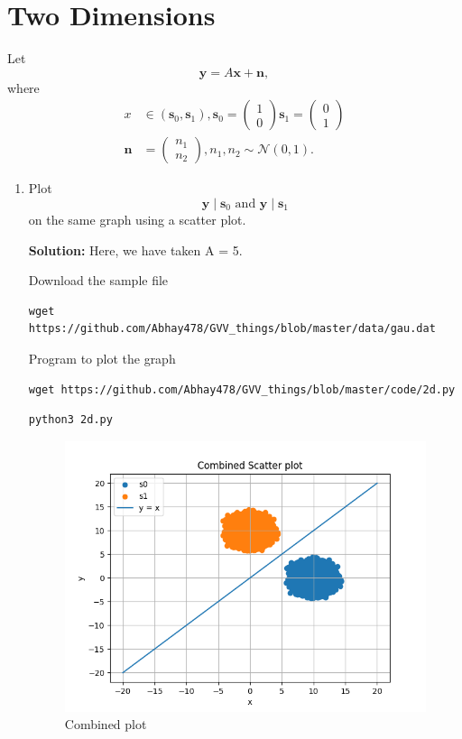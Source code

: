 \documentclass[journal,12pt,twocolumn]{IEEEtran}
\DeclareMathOperator*{\pipe}{|}
\renewcommand\thesection{\arabic{section}}
\providecommand{\mbf}{\mathbf}
\providecommand{\brak}[1]{\ensuremath{\left(#1\right)}}
\theoremstyle{remark}
\providecommand{\gauss}[2]{\mathcal{N}\ensuremath{\left(#1,#2\right)}}
\newcommand{\solution}{\noindent \textbf{Solution: }}
\newcommand{\myvec}[1]{\begin{pmatrix}#1\end{pmatrix}}
\numberwithin{equation}{section}
\numberwithin{equation}{section}
\begin{document}
        \newpage

\section{Two Dimensions}
Let 
\begin{equation}
\mbf{y} = A\mbf{x} + \mbf{n},
\end{equation}
where 
\begin{align}
x &\in \brak{\mbf{s}_0,\mbf{s}_1}, 
\mbf{s}_0 = \myvec{1 \\ 0} 
\mbf{s}_1 = \myvec{0 \\ 1}
\\
\mbf{n} &= \myvec{n_1 \\ n_2},
n_1,n_2 \sim \gauss{0}{1}.
\end{align}
%
\begin{enumerate}[label=\thesection.\arabic*,ref=\thesection.\theenumi]

\item
\label{ch5_fsk}
Plot 
%
\begin{equation}
\mbf{y}\pipe\mbf{s}_0 \text{ and } \mbf{y}\pipe\mbf{s}_1
\end{equation}
%
on the same graph using a scatter plot.

\solution
Here, we have taken A = 5.

Download the sample file
\begin{lstlisting}
wget https://github.com/Abhay478/GVV_things/blob/master/data/gau.dat 
\end{lstlisting}


Program to plot the graph
\begin{lstlisting}
wget https://github.com/Abhay478/GVV_things/blob/master/code/2d.py
\end{lstlisting}

\begin{lstlisting}
python3 2d.py
\end{lstlisting}

\begin{figure}[!h]
    \caption{Combined plot}
    \includegraphics[width = \columnwidth]{2d.png}
\end{figure}


\end{enumerate}
\end{document}
